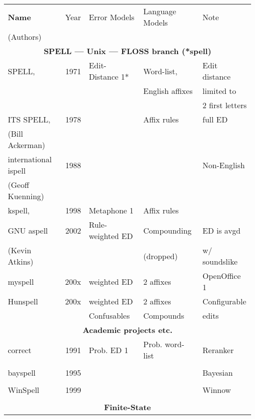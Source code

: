 \documentclass[officiallayout,draft]{unihelcompling}
\begin{document}
\begin{table}
    \centering
    \begin{tiny}
    \begin{tabular}{|l|r|l|l|l|}
        \hline
        \bf Name & Year & Error Models & Language Models & Note \\
(Authors) & & & & \\
        \hline
        \multicolumn{5}{|c|}{\bf SPELL --- Unix --- FLOSS branch (*spell) }\\
        \hline
             SPELL, & 1971 & Edit-Distance 1* & Word-list, & Edit distance \\
\citep{gorin1971spell} &  & & English affixes & limited to \\
                                  &  & &              & 2 first letters \\
        ITS SPELL, & 1978 &  & Affix rules & full ED \\
     (Bill Ackerman) & & & & \\
        international ispell & 1988 & & & Non-English \\
              (Geoff Kuenning) & & & & \\
        \hline
        kspell, & 1998 & Metaphone 1 & Affix rules & \\
        GNU aspell & 2002 & Rule-weighted ED & Compounding & ED is avgd \\
    (Kevin Atkins) & & & (dropped) & w/ soundslike \\
        \hline
        myspell & 200x & weighted ED & 2 affixes & OpenOffice 1 \\
        \hline
        Hunspell & 200x & weighted ED & 2 affixes & Configurable \\
                 &      & Confusables & Compounds & edits \\
        \hline
        \multicolumn{5}{|c|}{\bf Academic projects etc.} \\
        \hline
        correct & 1991 & Prob. ED 1 & Prob. word-list & Reranker \\
        \citep{church1991probability} & & & & \\
        \hline
        bayspell  & 1995 & & & Bayesian \\
        \citep{golding1995bayesian} \\
        \hline
        WinSpell & 1999 & & & Winnow \\
        \citep{golding1999winnow} & \\
        \hline
        \multicolumn{5}{|c|}{\bf Finite-State} \\

\end{tabular}
\end{tiny}
\end{table}
\end{document}
